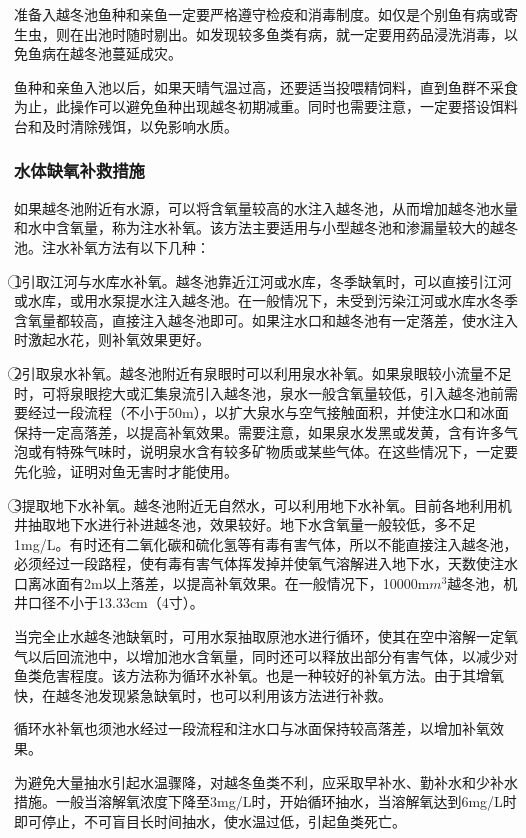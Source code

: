 \documentclass{ctexbook}
\begin{document}
准备入越冬池鱼种和亲鱼一定要严格遵守检疫和消毒制度。如仅是个别鱼有病或寄生虫，则在出池时随时剔出。如发现较多鱼类有病，就一定要用药品浸洗消毒，以免鱼病在越冬池蔓延成灾。

鱼种和亲鱼入池以后，如果天晴气温过高，还要适当投喂精饲料，直到鱼群不采食为止，此操作可以避免鱼种出现越冬初期减重。同时也需要注意，一定要搭设饵料台和及时清除残饵，以免影响水质。
\subsubsection{水体缺氧补救措施}
如果越冬池附近有水源，可以将含氧量较高的水注入越冬池，从而增加越冬池水量和水中含氧量，称为注水补氧。该方法主要适用与小型越冬池和渗漏量较大的越冬池。注水补氧方法有以下几种：

\textcircled{1}引取江河与水库水补氧。越冬池靠近江河或水库，冬季缺氧时，可以直接引江河或水库，或用水泵提水注入越冬池。在一般情况下，未受到污染江河或水库水冬季含氧量都较高，直接注入越冬池即可。如果注水口和越冬池有一定落差，使水注入时激起水花，则补氧效果更好。

\textcircled{2}引取泉水补氧。越冬池附近有泉眼时可以利用泉水补氧。如果泉眼较小流量不足时，可将泉眼挖大或汇集泉流引入越冬池，泉水一般含氧量较低，引入越冬池前需要经过一段流程（不小于50m），以扩大泉水与空气接触面积，并使注水口和冰面保持一定高落差，以提高补氧效果。需要注意，如果泉水发黑或发黄，含有许多气泡或有特殊气味时，说明泉水含有较多矿物质或某些气体。在这些情况下，一定要先化验，证明对鱼无害时才能使用。

\textcircled{3}提取地下水补氧。越冬池附近无自然水，可以利用地下水补氧。目前各地利用机井抽取地下水进行补进越冬池，效果较好。地下水含氧量一般较低，多不足1mg/L。有时还有二氧化碳和硫化氢等有毒有害气体，所以不能直接注入越冬池，必须经过一段路程，使有毒有害气体挥发掉并使氧气溶解进入地下水，天数使注水口离冰面有2m以上落差，以提高补氧效果。在一般情况下，10000m$m^{3}$越冬池，机井口径不小于13.33cm（4寸）。

当完全止水越冬池缺氧时，可用水泵抽取原池水进行循环，使其在空中溶解一定氧气以后回流池中，以增加池水含氧量，同时还可以释放出部分有害气体，以减少对鱼类危害程度。该方法称为循环水补氧。也是一种较好的补氧方法。由于其增氧快，在越冬池发现紧急缺氧时，也可以利用该方法进行补救。

循环水补氧也须池水经过一段流程和注水口与冰面保持较高落差，以增加补氧效果。

为避免大量抽水引起水温骤降，对越冬鱼类不利，应采取早补水、勤补水和少补水措施。一般当溶解氧浓度下降至3mg/L时，开始循环抽水，当溶解氧达到6mg/L时即可停止，不可盲目长时间抽水，使水温过低，引起鱼类死亡。
\end{document}
